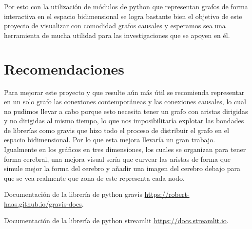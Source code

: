 \documentclass[a4paper,10pt,twocolumn]{article}
\begin{document}
Por esto con la utilización de módulos de python que representan grafos de forma interactiva en el espacio bidimensional se logra bastante bien el objetivo de este proyecto de visualizar con comodidad grafos causales y esperamos sea una herramienta de mucha utilidad para las investigaciones que se apoyen en él.
\section{Recomendaciones}\label{sec:rec}

Para mejorar este proyecto y que resulte aún más útil se recomienda representar en un solo grafo las conexiones contemporáneas y las conexiones causales, lo cual no pudimos llevar a cabo porque esto necesita tener un grafo con aristas dirigidas y no dirigidas al mismo tiempo, lo que nos imposibilitaría explotar las bondades de librerías como gravis \cite{gv} que hizo todo el proceso de distribuir el grafo en el espacio bidimensional. Por lo que esta mejora llevaría un gran trabajo. \\

Igualmente en los gráficos en tres dimensiones, los cuales se organizan para tener forma cerebral, una mejora visual sería que curvear las aristas de forma que simule mejor la forma del cerebro y añadir una imagen del cerebro debajo para que se vea realmente que zona de este representa cada nodo.




\begin{thebibliography}{99}

	Documentación de la librería de python gravis \href{https://robert-haas.github.io/gravis-docs/}{https://robert-haas.github.io/gravis-docs}.

	Documentación de la librería de python streamlit \href{https://docs.streamlit.io}{https://docs.streamlit.io}.



\end{thebibliography}



\label{end}
\end{document}
